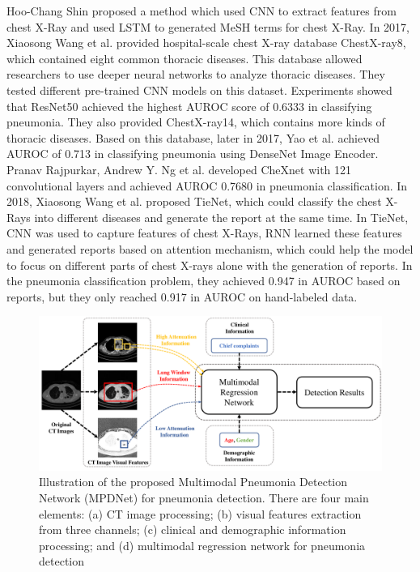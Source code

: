 \documentclass[journal]{IEEEtran}
\begin{document}
Hoo-Chang Shin \cite{Shin2016Learning} proposed a method which used CNN to extract features from chest X-Ray and used LSTM \cite{hochreiter1997long} to generated MeSH \cite{timmurphy.org} terms for chest X-Ray. In 2017, Xiaosong Wang et al. \cite{Wang2017ChestX} provided hospital-scale chest X-ray database ChestX-ray8, which contained eight common thoracic diseases. This database allowed researchers to use deeper neural networks to analyze thoracic diseases. They tested different pre-trained CNN models on this dataset. Experiments showed that ResNet50 achieved the highest AUROC score of 0.6333 in classifying pneumonia. They also provided ChestX-ray14, which contains more kinds of thoracic diseases.
Based on this database, later in 2017, Yao et al. \cite{yao2017learning} achieved AUROC of 0.713 in classifying pneumonia using DenseNet Image Encoder. Pranav Rajpurkar, Andrew Y. Ng et al. \cite{Rajpurkar2017CheXNet} developed CheXnet with 121 convolutional layers and achieved AUROC 0.7680 in pneumonia classification.
In 2018, Xiaosong Wang et al. \cite{Wang2018TieNet} proposed TieNet, which could classify the chest X-Rays into different diseases and generate the report at the same time. In TieNet, CNN was used to capture features of chest X-Rays, RNN learned these features and generated reports based on attention mechanism, which could help the model to focus on different parts of chest X-rays alone with the generation of reports. In the pneumonia classification problem, they achieved 0.947 in AUROC based on reports, but they only reached 0.917 in AUROC on hand-labeled data. 
\begin{figure}[htbp]
    \label{Illustration}
    \centerline{\includegraphics[width=170mm]{new1.pdf}}
    \vspace{-0cm}
    \caption{Illustration of the proposed Multimodal Pneumonia Detection Network (MPDNet) for pneumonia detection. There are four main elements: (a) CT image processing; (b) visual features extraction from three channels; (c) clinical and demographic information processing; and (d) multimodal regression network for pneumonia detection}
    \vspace{-0cm}
    \end{figure}
\end{document}
